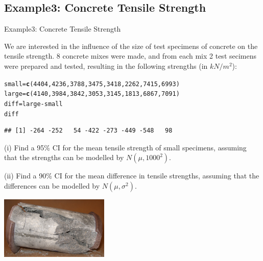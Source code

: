 \documentclass[t,xcolor=pdftex,dvipsnames,table]{beamer}\usepackage[]{graphicx}\usepackage[]{color}
\makeatletter
\newcommand{\hlnum}[1]{\textcolor[rgb]{0.686,0.059,0.569}{#1}}%
\newcommand{\hlopt}[1]{\textcolor[rgb]{0,0,0}{#1}}%
\newcommand{\hlstd}[1]{\textcolor[rgb]{0.345,0.345,0.345}{#1}}%
\newcommand{\hlkwb}[1]{\textcolor[rgb]{0.69,0.353,0.396}{#1}}%
\newcommand{\hlkwd}[1]{\textcolor[rgb]{0.737,0.353,0.396}{\textbf{#1}}}%
\newenvironment{kframe}{%
 \def\at@end@of@kframe{}%
 \ifinner\ifhmode%
  \def\at@end@of@kframe{\end{minipage}}%
  \begin{minipage}{\columnwidth}%
 \fi\fi%
 \def\FrameCommand##1{\hskip\@totalleftmargin \hskip-\fboxsep
 \colorbox{shadecolor}{##1}\hskip-\fboxsep
     \hskip-\linewidth \hskip-\@totalleftmargin \hskip\columnwidth}%
 \MakeFramed {\advance\hsize-\width
   \@totalleftmargin\z@ \linewidth\hsize
   \@setminipage}}%
 {\par\unskip\endMakeFramed%
 \at@end@of@kframe}
\newenvironment{knitrout}{}{} %
\makeatother
\begin{document}
\subsection[Examples]{Example3: Concrete Tensile Strength}
\begin{frame}[fragile]{Example3: Concrete Tensile Strength}

We are interested in the influence of the size of test specimens of concrete on the tensile strength. 
8 concrete mixes were made, and from each mix 2 test secimens were prepared and tested, resulting in the following strengths (in $kN/m^2$):

\begin{knitrout}
\color{fgcolor}\begin{kframe}
\begin{alltt}
\hlstd{small}\hlkwb{=}\hlkwd{c}\hlstd{(}\hlnum{4404}\hlstd{,}\hlnum{4236}\hlstd{,}\hlnum{3788}\hlstd{,}\hlnum{3475}\hlstd{,}\hlnum{3418}\hlstd{,}\hlnum{2262}\hlstd{,}\hlnum{7415}\hlstd{,}\hlnum{6993}\hlstd{)}
\hlstd{large}\hlkwb{=}\hlkwd{c}\hlstd{(}\hlnum{4140}\hlstd{,}\hlnum{3984}\hlstd{,}\hlnum{3842}\hlstd{,}\hlnum{3053}\hlstd{,}\hlnum{3145}\hlstd{,}\hlnum{1813}\hlstd{,}\hlnum{6867}\hlstd{,}\hlnum{7091}\hlstd{)}
\hlstd{diff}\hlkwb{=}\hlstd{large}\hlopt{-}\hlstd{small}
\hlstd{diff}
\end{alltt}
\begin{verbatim}
## [1] -264 -252   54 -422 -273 -449 -548   98
\end{verbatim}
\end{kframe}
\end{knitrout}

\end{frame}


\begin{frame}[fragile]{}

(i) Find a 95\% CI for the mean tensile strength of small specimens, assuming that the strengths can be modelled by $N(\mu,1000^2)$. 

\vspace{.5cm}
(ii) Find a 90\% CI for the mean difference in tensile strengths, assuming that the differences can be modelled by $N(\mu,\sigma^2)$. 

\begin{center}
\includegraphics[height=3cm]{../images/Concrete.jpg}
\end{center}
\end{frame}
\end{document}
